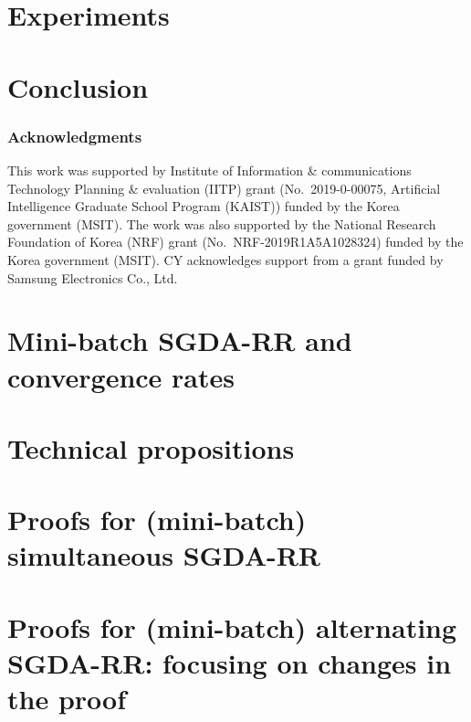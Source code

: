 \documentclass{article}
\begin{document}
\section{Experiments}
\label{sec:experiments}


\section{Conclusion}
\label{sec:conclusion}


\subsubsection*{Acknowledgments}
This work was supported by Institute of Information \& communications Technology Planning \& evaluation (IITP) grant (No.\ 2019-0-00075, Artificial Intelligence Graduate School Program (KAIST)) funded by the Korea government (MSIT).
The work was also supported by the National Research Foundation of Korea (NRF) grant (No.\ NRF-2019R1A5A1028324) funded by the Korea government (MSIT). CY acknowledges support from a grant funded by Samsung Electronics Co., Ltd.




\newpage
\tableofcontents
\newpage

\appendix

\section{Mini-batch SGDA-RR and convergence rates}
\label{sec:minibatch}


\section{Technical propositions}
\label{sec:propositions}


\section{Proofs for (mini-batch) simultaneous SGDA-RR}
\label{sec:proofs simSGDA RR}


\section{Proofs for (mini-batch) alternating SGDA-RR: focusing on changes in the proof}
\label{sec:proofs altSGDA RR}

\end{document}
